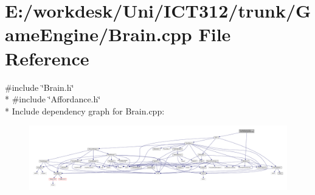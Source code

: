 \section{E\+:/workdesk/\+Uni/\+I\+C\+T312/trunk/\+Game\+Engine/\+Brain.cpp File Reference}
\label{_brain_8cpp}
{\ttfamily \#include \char`\"{}Brain.\+h\char`\"{}}\\*
{\ttfamily \#include \char`\"{}Affordance.\+h\char`\"{}}\\*
Include dependency graph for Brain.\+cpp\+:\nopagebreak
\begin{figure}[H]
\begin{center}
\leavevmode
\includegraphics[width=350pt]{d4/d60/_brain_8cpp__incl}
\end{center}
\end{figure}
